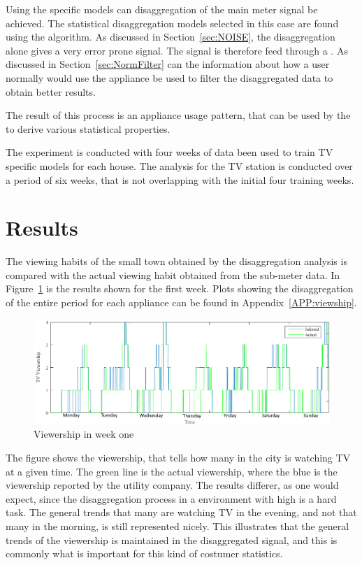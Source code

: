 Using the specific models can disaggregation of the main meter signal be achieved. The statistical disaggregation models selected in this case are found using the  algorithm. As discussed in Section~\ref{sec:NOISE}, the disaggregation alone gives a very error prone signal. The signal is therefore feed through a . As discussed in Section~\ref{sec:NormFilter} can the information about how a user normally would use the appliance be used to filter the disaggregated data to obtain better results. 

The result of this process is an appliance usage pattern, that can be used by the  to derive various statistical properties.  

The experiment is conducted with four weeks of data been used to train TV specific models for each house. The analysis for the TV station is conducted over a period of six weeks, that is not overlapping with the initial four training weeks. 

\section{Results}
The viewing habits of the small town obtained by the disaggregation analysis is compared with the actual viewing habit obtained from the sub-meter data. In Figure~\ref{fig:WHW} is the results shown for the first week. Plots showing the disaggregation of the entire period for each appliance can be found in Appendix~\ref{APP:viewship}.

\begin{figure}[H]
\centering
\includegraphics[width=1\textwidth]{billeder/Viewership.png}
\caption{Viewership in week one}
\label{fig:WHW}
\end{figure}

The figure shows the viewership, that tells how many in the city is watching TV at a given time. The green line is the actual viewership, where the blue is the viewership reported by the utility company. The results differer, as one would expect, since the disaggregation process in a environment with high  is a hard task. The general trends that many are watching TV in the evening, and not that many in the morning, is still represented nicely. This illustrates that the general trends of the viewership is maintained in the disaggregated signal, and this is commonly what is important for this kind of costumer statistics. 

